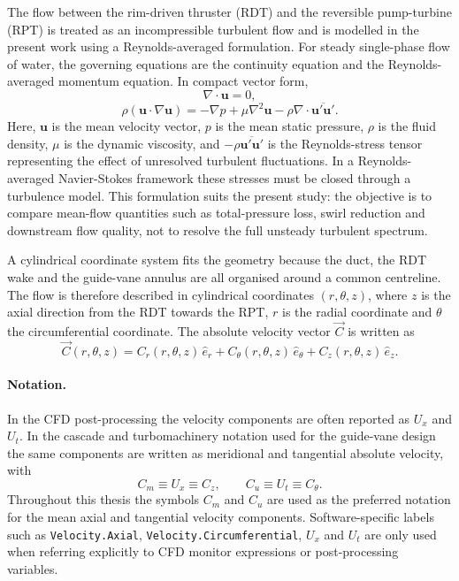 The flow between the rim-driven thruster (RDT) and the reversible pump-turbine (RPT) is treated as an incompressible turbulent flow and is modelled in the present work using a Reynolds-averaged formulation. For steady single-phase flow of water, the governing equations are the continuity equation and the Reynolds-averaged momentum equation. In compact vector form,
\begin{equation}
\nabla \cdot \mathbf{u} = 0,
\label{eq:continuity}
\end{equation}
\begin{equation}
\rho \left( \mathbf{u} \cdot \nabla \mathbf{u} \right)
=
-\nabla p
+ \mu \nabla^2 \mathbf{u}
- \rho \nabla \cdot \overline{\mathbf{u}'\mathbf{u}'}.
\label{eq:rans_momentum}
\end{equation}
Here, $\mathbf{u}$ is the mean velocity vector, $p$ is the mean static pressure, $\rho$ is the fluid density, $\mu$ is the dynamic viscosity, and $-\rho \overline{\mathbf{u}'\mathbf{u}'}$ is the Reynolds-stress tensor representing the effect of unresolved turbulent fluctuations. In a Reynolds-averaged Navier-Stokes framework these stresses must be closed through a turbulence model. This formulation suits the present study: the objective is to compare mean-flow quantities such as total-pressure loss, swirl reduction and downstream flow quality, not to resolve the full unsteady turbulent spectrum.

A cylindrical coordinate system fits the geometry because the duct, the RDT wake and the guide-vane annulus are all organised around a common centreline. The flow is therefore described in cylindrical coordinates $(r,\theta,z)$, where $z$ is the axial direction from the RDT towards the RPT, $r$ is the radial coordinate and $\theta$ the circumferential coordinate. The absolute velocity vector $\vec{C}$ is written as
\begin{equation}
\vec{C}(r,\theta,z)
=
C_r(r,\theta,z)\,\hat{e}_r
+
C_\theta(r,\theta,z)\,\hat{e}_\theta
+
C_z(r,\theta,z)\,\hat{e}_z.
\label{eq:cylindrical_velocity}
\end{equation}

\paragraph{Notation.}
In the CFD post-processing the velocity components are often reported as $U_x$ and $U_t$. In the cascade and turbomachinery notation used for the guide-vane design the same components are written as meridional and tangential absolute velocity, with
\begin{equation}
C_m \equiv U_x \equiv C_z,
\qquad
C_u \equiv U_t \equiv C_\theta.
\label{eq:notation_equivalence}
\end{equation}
Throughout this thesis the symbols $C_m$ and $C_u$ are used as the preferred notation for the mean axial and tangential velocity components. Software-specific labels such as \texttt{Velocity.Axial}, \texttt{Velocity.Circumferential}, $U_x$ and $U_t$ are only used when referring explicitly to CFD monitor expressions or post-processing variables.


